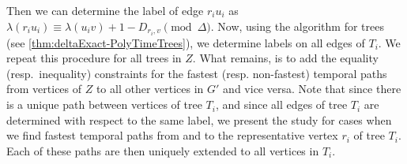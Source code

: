 \documentclass[a4paper,UKenglish,cleveref, autoref, thm-restate]{lipics-v2021}
\begin{document}
Then
we can determine the label of edge $r_i u_i$ as 
$\lambda (r_i u_i) \equiv \lambda(u_i v) + 1 - D_{r_i,v} \pmod \Delta$.
Now, using the algorithm for trees (see \cref{thm:deltaExact-PolyTimeTrees}), we determine labels on all edges of $T_i$.
We repeat this procedure for all trees in $Z$.
What remains, is to add the equality (resp.~inequality) constraints for the fastest (resp. non-fastest) temporal paths from vertices of $Z$ to all other vertices in $G'$ and vice versa.
Note that since 
there is a unique path between vertices of tree $T_i$, and since all edges of tree $T_i$ are determined with respect to the same label,
we present the study for cases when we find fastest temporal paths from and to the 
representative vertex $r_i$ of tree $T_i$.
Each of these paths are then uniquely extended to all vertices in $T_i$.
\end{document}
